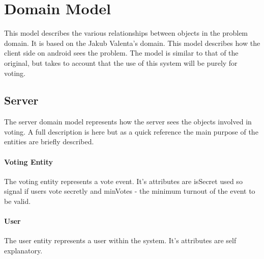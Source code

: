\documentclass[11pt,twoside,a4paper]{book}
\begin{document}

\section{Domain Model}
This model describes the various relationships between objects in the problem domain. It is based on the Jakub Valenta's domain.
This model describes how the client side on android sees the problem. The model is similar to that of the original, but takes to account that the use of this system will be purely for voting. 
\subsection{Server}
The server domain model represents how the server sees the objects involved in voting. A full description is here \cite{bakalarkaJV} but as a quick reference the main purpose of the entities are briefly described.
\paragraph{Voting Entity} 
The voting entity represents a vote event. It's attributes are isSecret used so signal if users vote secretly and minVotes - the minimum turnout of the event to be valid.
\paragraph{User} 
The user entity represents a user within the system. It's attributes are self explanatory.
\end{document}
